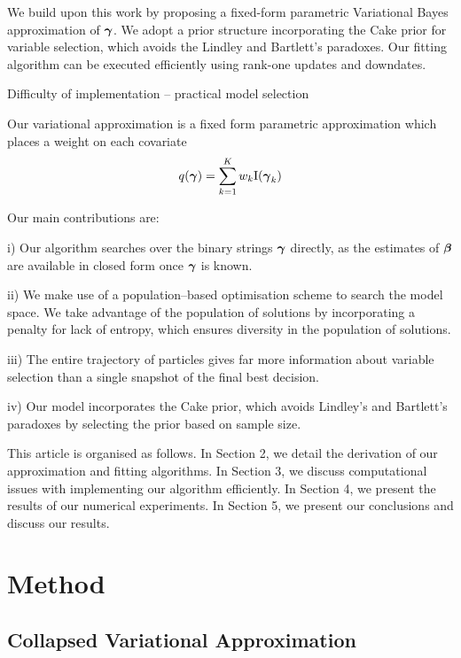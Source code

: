 \documentclass{amsart}[12pt]
\begin{document}
We build upon this work by proposing a fixed-form parametric Variational Bayes approximation of ${\boldsymbol \gamma}$.
We adopt a prior structure incorporating the Cake prior for variable selection, which avoids the Lindley
and Bartlett's paradoxes.
Our fitting algorithm can be executed efficiently using rank-one updates and downdates.

Difficulty of implementation -- practical model selection
\cite{Chipman2014}

Our variational approximation is a fixed form parametric approximation which places a weight on each covariate
\[
	q({\boldsymbol \gamma}) = \sum_{k=1}^K w_k \text{I}({\boldsymbol \gamma}_k)
\]


Our main contributions are:

i) Our algorithm searches over the binary strings ${\boldsymbol \gamma}$ directly, as the estimates of ${\boldsymbol \beta}$ are available 
in closed form once ${\boldsymbol \gamma}$ is known.

ii) We make use of a population--based optimisation scheme to search the model space. We take advantage of the
population of solutions by incorporating a penalty for lack of entropy, which ensures diversity in the
population of solutions.

iii) The entire trajectory of particles gives far more information about variable selection than a single
snapshot of the final best decision.

iv) Our model incorporates the Cake prior, which avoids Lindley's and Bartlett's paradoxes by selecting the
prior based on sample size.

This article is organised as follows. In Section 2, we detail the derivation of our approximation and fitting
algorithms. In Section 3, we discuss computational issues with implementing our algorithm efficiently. In
Section 4, we present the results of our numerical experiments. In Section 5, we present our conclusions and
discuss our results.

\section{Method}

\subsection{Collapsed Variational Approximation}
\end{document}
